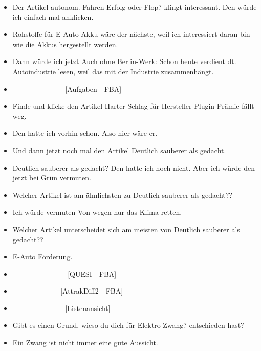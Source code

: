 {\begin{itemize}[]
              Wenn ich jetzt nämlich schon in dieser Staat-Kategorie bin, dann würde ich da jetzt auch mehr zu lesen wollen.
        \item {} Der Artikel \flqq autonom. Fahren Erfolg oder Flop?\frqq{} klingt interessant.
              Den würde ich einfach mal anklicken.
        \item {} \flqq Rohstoffe für E-Auto Akku\frqq{} wäre der nächste, weil ich interessiert daran bin wie die Akkus hergestellt werden.
        \item {} Dann würde ich jetzt \flqq Auch ohne Berlin-Werk: Schon heute verdient dt. Autoindustrie\frqq{} lesen, weil das mit der Industrie zusammenhängt.
        \item {---------------------} [Aufgaben - FBA] {---------------------}
        \item {} Finde und klicke den Artikel \flqq Harter Schlag für Hersteller Plugin Prämie fällt weg\frqq{}.
        \item {} Den hatte ich vorhin schon. Also hier wäre er.
        \item {} Und dann jetzt noch mal den Artikel \flqq Deutlich sauberer als gedacht\frqq{}.
        \item {} \flqq Deutlich sauberer als gedacht\frqq{}?
              Den hatte ich noch nicht.
              Aber ich würde den jetzt bei Grün vermuten.
        \item {} Welcher Artikel ist am ähnlichsten zu \flqq Deutlich sauberer als gedacht?\frqq{}?
        \item {} Ich würde vermuten \flqq Von wegen nur das Klima retten\frqq{}.
        \item {} Welcher Artikel unterscheidet sich am meisten von \flqq Deutlich sauberer als gedacht?\frqq{}?
        \item {} \flqq E-Auto Förderung\frqq{}.
        \item {----------------------} [QUESI - FBA] {----------------------}
        \item {-------------------} [AttrakDiff2 - FBA] {-------------------}
        \item {---------------------} [Listenansicht] {---------------------}
        \item {} Gibt es einen Grund, wieso du dich für \flqq Elektro-Zwang?\frqq{} entschieden hast?
        \item {} Ein Zwang ist nicht immer eine gute Aussicht.

\end{itemize}}
